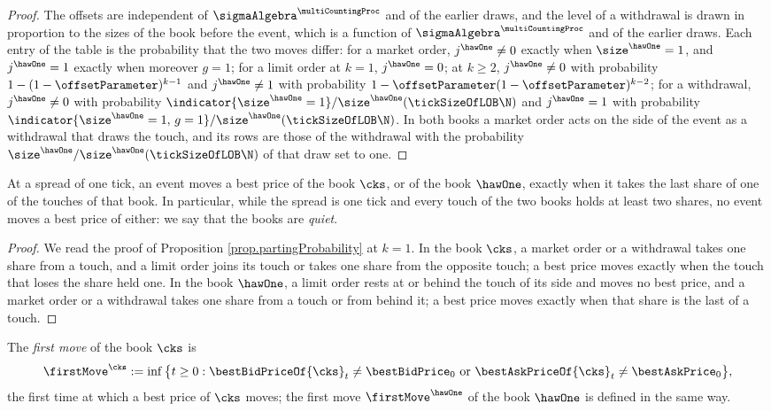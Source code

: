 \begin{proof}
 The offsets are independent of $\sigmaAlgebra^{\multiCountingProc}$ and of the earlier
 draws,
 and the level of a withdrawal is drawn in proportion to the sizes of the book before the
 event,
 which is a function of $\sigmaAlgebra^{\multiCountingProc}$ and of the earlier draws.
 Each entry of the table is the probability that the two moves differ:
 for a market order,
 $j^{\hawOne} \neq 0$ exactly when $\size^{\hawOne} = 1$,
 and $j^{\hawOne} = 1$ exactly when moreover $g = 1$;
 for a limit order at $k = 1$, $j^{\hawOne} = 0$;
 at $k \geq 2$,
 $j^{\hawOne} \neq 0$ with probability $1 - (1-\offsetParameter)^{k-1}$
 and $j^{\hawOne} \neq 1$ with probability $1 - \offsetParameter(1-\offsetParameter)^{k-2}$;
 for a withdrawal,
 $j^{\hawOne} \neq 0$ with probability
 $\indicator{\size^{\hawOne} = 1} / \size^{\hawOne}(\tickSizeOfLOB\N)$
 and $j^{\hawOne} = 1$ with probability
 $\indicator{\size^{\hawOne} = 1, \, g = 1} / \size^{\hawOne}(\tickSizeOfLOB\N)$.
 In both books a market order acts on the side of the event
 as a withdrawal that draws the touch,
 and its rows are those of the withdrawal
 with the probability $\size^{\hawOne}/\size^{\hawOne}(\tickSizeOfLOB\N)$ of that draw
 set to one.
\end{proof}

\begin{corol}\label{corol.quietBook}
 At a spread of one tick,
 an event moves a best price of the book $\cks$, or of the book $\hawOne$,
 exactly when it takes the last share of one of the touches of that book.
 In particular, while the spread is one tick
 and every touch of the two books holds at least two shares,
 no event moves a best price of either:
 we say that the books are \emph{quiet}.
\end{corol}
\begin{proof}
 We read the proof of Proposition \ref{prop.partingProbability} at $k = 1$.
 In the book $\cks$,
 a market order or a withdrawal takes one share from a touch,
 and a limit order joins its touch or takes one share from the opposite touch;
 a best price moves exactly when the touch that loses the share held one.
 In the book $\hawOne$,
 a limit order rests at or behind the touch of its side and moves no best price,
 and a market order or a withdrawal takes one share from a touch or from behind it;
 a best price moves exactly when that share is the last of a touch.
\end{proof}

\begin{defi}\label{def.firstMoves}
 The \emph{first move} of the book $\cks$ is
 \begin{equation*}
  \firstMove^{\cks} := \inf \big\lbrace t \geq 0 :
  \bestBidPriceOf{\cks}_t \neq \bestBidPrice_0
  \text{ or }
  \bestAskPriceOf{\cks}_t \neq \bestAskPrice_0 \big\rbrace ,
 \end{equation*}
 the first time at which a best price of $\cks$ moves;
 the first move $\firstMove^{\hawOne}$ of the book $\hawOne$ is defined in the same way.
\end{defi}

